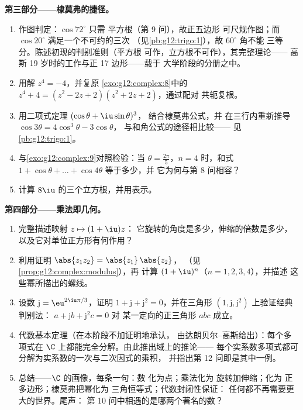 \begin{problem}
\medskip
\noindent\textbf{第三部分——棣莫弗的捷径。}
\begin{enumerate}[resume]
  \item 作图判定：$\cos 72^\circ$ 只需
        平方根（第 9 问），故正五边形
        可尺规作图；而 $\cos 20^\circ$
        满足一个不可约的三次
        （见\cref{pb:g12:trigo:1}），故 $60^\circ$ 角不能
        三等分。陈述初现的判别准则（平方根
        可作，立方根不可作），其完整理论——
        高斯 19 岁时的工作与正 17 边形——载于
        大学阶段的分册之中。
  \item 用解 $z^4 = -4$，并复原
        \cref{exo:g12:complex:8}中的
        $z^4 + 4 = (z^2 - 2z + 2)(z^2 + 2z + 2)$，通过配对
        共轭复根。
  \item 用二项式定理 $(\cos\theta + \iu\sin\theta)^3$，
        结合棣莫弗公式，并
        在三行内重新推导 $\cos 3\theta = 4\cos^3\theta - 3\cos\theta$，
        与和角公式的途径相比较——
        见\cref{pb:g12:trigo:1}。
  \item 与\cref{exo:g12:complex:9}对照检验：当
        $\theta = \frac{2\pi}{5}$，$n = 4$ 时，和式
        $1 + \cos\theta + \dots + \cos 4\theta$ 等于多少，并
        它为何与第 8 问相容？
  \item 计算 $8\iu$ 的三个立方根，并用表示。
\end{enumerate}

\medskip
\noindent\textbf{第四部分——乘法即几何。}
\begin{enumerate}[resume]
  \item 完整描述映射 $z \mapsto (1 + \iu)z$：
        它旋转的角度是多少，伸缩的倍数是多少，
        以及它对单位正方形有何作用？
  \item 利用证明 $\abs{z_1 z_2} = \abs{z_1}\,\abs{z_2}$，
        （见\cref{prop:g12:complex:modulus}），再
        计算 $(1+\iu)^n$（$n = 1, 2, 3, 4$），并描述
        这些幂所描出的螺线。
  \item 设数 $\mathrm{j} = \eu^{2\iu\pi/3}$，证明
        $1 + \mathrm{j} + \mathrm{j}^2 = 0$，并在三角形
        $\left(1, \mathrm{j}, \mathrm{j}^2\right)$ 上验证经典判别法：
        $a + \mathrm{j} b + \mathrm{j}^2 c = 0$ 对
        某一定向的正三角形 $abc$ 成立。
  \item 代数基本定理（在本阶段不加证明地承认，
        由达朗贝尔--高斯给出）：每个多项式在
        $\C$ 上都能完全分解。由此推出域上的推论——
        每个实系数多项式都可分解为实系数的一次与二次因式的乘积，
        并指出第 12 问即是其中一例。
  \item 总结——$\C$ 的画像，每条一句：数
        化为点；乘法化为
        旋转加伸缩；化为
        正多边形；棣莫弗把幂化为
        三角恒等式；代数封闭性保证：
        任何都不再需要更大的世界。尾声：
        第 10 问中相遇的是哪两个著名的数？
\end{enumerate}
\end{problem}
